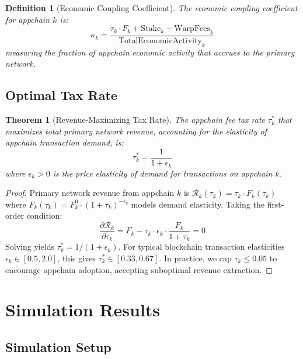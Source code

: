\documentclass[11pt,a4paper]{article}
\newtheorem{theorem}{Theorem}
\newtheorem{definition}{Definition}
\begin{document}
\begin{definition}[Economic Coupling Coefficient]
The economic coupling coefficient for appchain $k$ is:
\begin{equation}
    \kappa_k = \frac{\tau_k \cdot F_k + \text{Stake}_k + \text{WarpFees}_k}{\text{TotalEconomicActivity}_k}
\end{equation}
measuring the fraction of appchain economic activity that accrues to the primary network.
\end{definition}

\subsection{Optimal Tax Rate}

\begin{theorem}[Revenue-Maximizing Tax Rate]
The appchain fee tax rate $\tau_k^*$ that maximizes total primary network revenue, accounting for the elasticity of appchain transaction demand, is:
\begin{equation}
    \tau_k^* = \frac{1}{1 + \epsilon_k}
\end{equation}
where $\epsilon_k > 0$ is the price elasticity of demand for transactions on appchain $k$.
\end{theorem}

\begin{proof}
Primary network revenue from appchain $k$ is $\mathcal{R}_k(\tau_k) = \tau_k \cdot F_k(\tau_k)$ where $F_k(\tau_k) = F_k^0 \cdot (1 + \tau_k)^{-\epsilon_k}$ models demand elasticity. Taking the first-order condition:
\begin{equation}
    \frac{\partial \mathcal{R}_k}{\partial \tau_k} = F_k - \tau_k \cdot \epsilon_k \cdot \frac{F_k}{1 + \tau_k} = 0
\end{equation}
Solving yields $\tau_k^* = 1 / (1 + \epsilon_k)$. For typical blockchain transaction elasticities $\epsilon_k \in [0.5, 2.0]$, this gives $\tau_k^* \in [0.33, 0.67]$. In practice, we cap $\tau_k \leq 0.05$ to encourage appchain adoption, accepting suboptimal revenue extraction.
\end{proof}

\section{Simulation Results}\label{sec:simulation}

\subsection{Simulation Setup}
\end{document}
